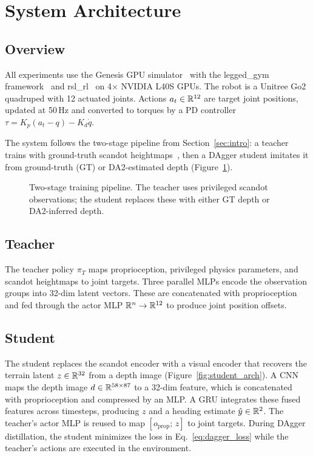 \section{System Architecture}
\label{sec:arch}

\subsection{Overview}

All experiments use the Genesis GPU
simulator~\citep{genesis2024} with the
legged\_gym framework~\citep{rudin2022learning} and
rsl\_rl~\citep{schwarke2025rslrl} on 4$\times$ NVIDIA L40S GPUs.
The robot is a Unitree Go2 quadruped with 12 actuated joints.
Actions $a_t \in \mathbb{R}^{12}$ are target joint positions, updated at 50\,Hz
and converted to torques by a PD controller
$\tau = K_p (a_t - q) - K_d \dot{q}$.

The system follows the two-stage pipeline from
Section~\ref{sec:intro}: a teacher trains with ground-truth scandot
heightmaps~\citep{agarwal2023legged}, then a DAgger student imitates it from
ground-truth (GT) or DA2-estimated depth (Figure~\ref{fig:pipeline}).

\begin{figure}[t]
	\centering
	
	\caption{Two-stage training pipeline.  The teacher uses privileged
		scandot observations; the student replaces these with either GT depth or DA2-inferred depth.}
	\label{fig:pipeline}
\end{figure}

\subsection{Teacher}

The teacher policy $\pi_T$ maps proprioception, privileged physics
parameters, and scandot heightmaps to joint targets.  Three parallel
MLPs encode the observation groups into 32-dim latent vectors.
These are concatenated with proprioception and fed through the actor MLP
$\mathbb{R}^{n} \to \mathbb{R}^{12}$ to produce joint position offsets.

\subsection{Student}
\label{sec:student}

The student replaces the scandot encoder with a visual encoder that
recovers the terrain latent $z \in \mathbb{R}^{32}$ from a depth image
(Figure~\ref{fig:student_arch}).
A CNN maps the depth image $d \in \mathbb{R}^{58 \times 87}$ to a 32-dim
feature, which is concatenated with proprioception and compressed by
an MLP.  A GRU integrates these fused features across timesteps,
producing $z$ and a heading estimate $\hat{y} \in \mathbb{R}^{2}$.
The teacher's actor MLP is reused to map $[o_\text{prop};\, z]$ to
joint targets.  During DAgger distillation, the student minimizes the loss in
Eq.~\ref{eq:dagger_loss} while the teacher's actions are executed
in the environment.

